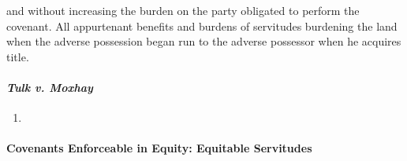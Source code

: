 \begin{enumerate}
\begin{enumerate}
\begin{enumerate}
\begin{enumerate}
                and without increasing the burden on the party obligated to 
                perform the covenant. All appurtenant benefits and burdens of 
                servitudes burdening the land when the adverse possession 
                began run to the adverse possessor when he acquires title.
            \end{enumerate}
        \end{enumerate}
    \end{enumerate}
\end{enumerate}

\paragraph{\emph{Tulk v. Moxhay}}

\begin{enumerate}
    \item %
\end{enumerate}

\paragraph{Covenants Enforceable in Equity: Equitable Servitudes}

